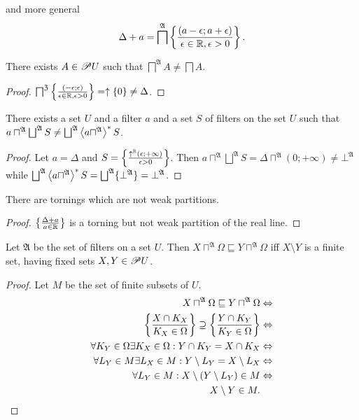and more general
\[
\Delta+a=\bigsqcap^{\mathfrak{A}}\left\{ \frac{(a-\epsilon;a+\epsilon)}{\epsilon\in\mathbb{R},\epsilon>0}\right\}.
\]

\begin{example}
There exists $A\in\mathscr{P} U$ such that $\bigsqcap^{\mathfrak{A}}A\ne\bigsqcap A$.\end{example}
\begin{proof}
$\bigsqcap^{\mathfrak{Z}}\left\{ \frac{(-\epsilon;\epsilon)}{\epsilon\in\mathbb{R},\epsilon>0}\right\}=\uparrow\{0\}\ne\Delta$.\end{proof}
\begin{example}
There exists a set $U$ and a filter $a$ and a set $S$ of filters
on the set $U$ such that $a\sqcap^{\mathfrak{A}}\bigsqcup^{\mathfrak{A}}S\ne\bigsqcup^{\mathfrak{A}}\left\langle a\sqcap^{\mathfrak{A}}\right\rangle ^{\ast}S$.\end{example}
\begin{proof}
Let $a=\Delta$ and $S=\left\{ \frac{\uparrow^{\mathbb{R}}(\epsilon;+\infty)}{\epsilon>0}\right\}$.
Then $a\sqcap^{\mathfrak{A}}\bigsqcup^{\mathfrak{A}}S=\Delta\sqcap^{\mathfrak{A}}(0;+\infty)\ne\bot^{\mathfrak{A}}$
while $\bigsqcup^{\mathfrak{A}}\left\langle a\sqcap^{\mathfrak{A}}\right\rangle ^{\ast}S=\bigsqcup^{\mathfrak{A}}\{\bot^{\mathfrak{A}}\}=\bot^{\mathfrak{A}}$.\end{proof}
\begin{example}
There are tornings which are not weak partitions.\end{example}
\begin{proof}
$\left\{ \frac{\Delta+a}{a\in\mathbb{R}}\right\}$ is a torning but not weak partition
of the real line.\end{proof}
\begin{lem}
Let $\mathfrak{A}$ be the set of filters on a set $U$. Then $X\sqcap^{\mathfrak{A}}\Omega\sqsubseteq Y\sqcap^{\mathfrak{A}}\Omega$
iff $X\setminus Y$ is a finite set, having fixed sets $X,Y\in\mathscr{P} U$.\end{lem}
\begin{proof}
Let $M$ be the set of finite subsets of $U$.
\begin{align*}
X\sqcap^{\mathfrak{A}}\Omega\sqsubseteq Y\sqcap^{\mathfrak{A}}\Omega & \Leftrightarrow\\
\left\{ \frac{X\cap K_{X}}{K_{X}\in\Omega}\right\}\supseteq\left\{ \frac{Y\cap K_{Y}}{K_{Y}\in\Omega}\right\} & \Leftrightarrow\\
\forall K_{Y}\in\Omega\exists K_{X}\in\Omega:Y\cap K_{Y}=X\cap K_{X} & \Leftrightarrow\\
\forall L_{Y}\in M\exists L_{X}\in M:Y\setminus L_{Y}=X\setminus L_{X} & \Leftrightarrow\\
\forall L_{Y}\in M:X\setminus(Y\setminus L_{Y})\in M & \Leftrightarrow\\
X\setminus Y\in M.
\end{align*}
\end{proof}
